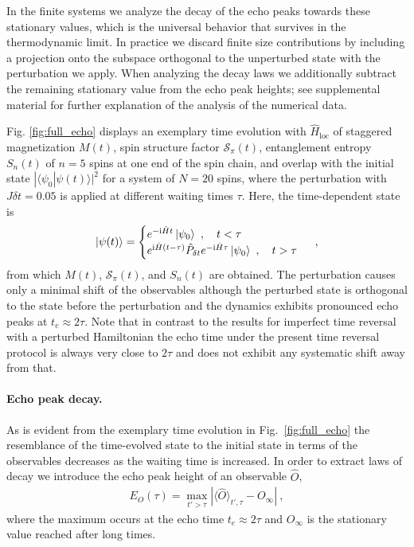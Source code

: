 \documentclass[%
 reprint,
unsortedaddress,
 amsmath,amssymb,
 prl,
]{revtex4-1}
\newcommand{\im}{\mathrm{i}}
\begin{document}
In the finite systems we analyze the decay of the echo peaks towards these stationary values,
which is the universal behavior that survives in the thermodynamic limit.
In practice we discard finite size contributions by including a projection onto the subspace orthogonal to the unperturbed state with the perturbation we apply.
When analyzing the decay laws we additionally subtract the 
remaining stationary value from the echo peak heights;
see supplemental material \cite{supplement} for further explanation of the analysis of the numerical data.

Fig. \ref{fig:full_echo} displays an exemplary time evolution with $\hat H_\text{loc}$ 
of staggered magnetization $M(t)$,
spin structure factor $\mathcal S_\pi(t)$, entanglement entropy $S_n(t)$ of $n=5$ spins
at one end of the spin chain, and overlap with the initial state $|\langle\psi_0|\psi(t)\rangle|^2$ for a system 
of $N=20$ spins, where the perturbation with $J\delta t=0.05$ is applied at different waiting times $\tau$. 
Here, the time-dependent state is
\begin{align}
	\ket{\psi(t)}=
	\begin{cases}
		e^{-\im\hat Ht}\ket{\psi_0}\ ,\quad t<\tau\\
		e^{\im\hat H(t-\tau)}\hat P_{\delta t}e^{-\im\hat H\tau}\ket{\psi_0}\ ,\quad t>\tau\\
	\end{cases}\ ,
\end{align}
from which $M(t)$, $\mathcal S_\pi(t)$, and $S_n(t)$ are obtained.
The perturbation causes only a minimal shift of the observables although the perturbed state
is orthogonal to the state before the perturbation and the dynamics exhibits pronounced echo peaks 
at $t_e\approx2\tau$. %
Note that in
contrast to the results for imperfect time reversal with a perturbed Hamiltonian \cite{Schmitt2016}
the echo time under the present time reversal protocol is always very close to $2\tau$ and does not 
exhibit any systematic shift away from that.


\paragraph{Echo peak decay.}
As is evident from the exemplary time evolution in Fig.\ \ref{fig:full_echo} the resemblance of the
time-evolved state to the initial state in terms of the observables decreases as the waiting time
is increased. In order to extract laws of decay we introduce the echo peak height of an observable 
$\hat O$,
\begin{align}
	E_O(\tau)
	=\max_{t'>\tau}|\langle\hat O\rangle_{t',\tau}-O_\infty|\ ,
\end{align}
where the maximum occurs at the echo time $t_e\approx2\tau$ and $O_\infty$ is the stationary value
reached after long times.
\end{document}
